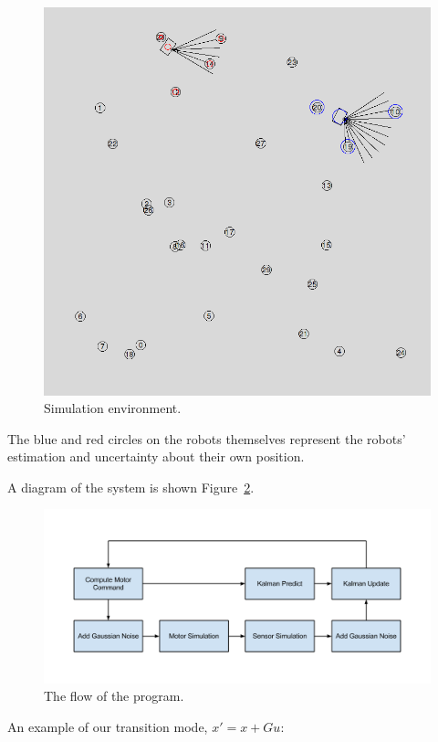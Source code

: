 \documentclass[prodmode,acmtecs]{acmsmall} %
\begin{document}
\begin{figure}[h!]
\includegraphics[width=\textwidth]{screenshot.png}
\caption{Simulation environment.}
\label{fig:simulation}
\end{figure}


The blue and red circles on the robots themselves represent the robots' estimation and uncertainty about their own position.

A diagram of the system is shown Figure~\ref{fig:system}.

\begin{figure}[h!]
\includegraphics[width=\textwidth]{systemdiagram.png}
\caption{The flow of the program.}
\label{fig:system}
\end{figure}

An example of our transition mode, $x' = x + Gu$:
\end{document}
